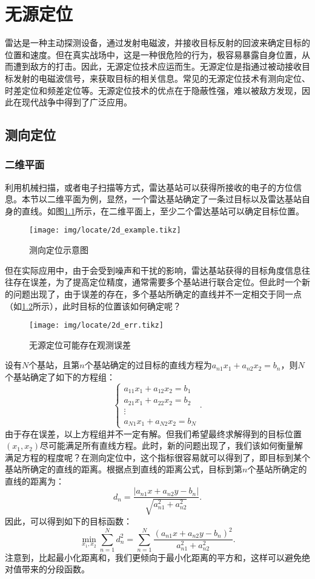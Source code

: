 \chapter{无源定位}

雷达是一种主动探测设备，通过发射电磁波，并接收目标反射的回波来确定目标的位置和速度。但在真实战场中，这是一种很危险的行为，极容易暴露自身位置，从而遭到敌方的打击。因此，无源定位技术应运而生。无源定位是指通过被动接收目标发射的电磁波信号，来获取目标的相关信息。常见的无源定位技术有测向定位、时差定位和频差定位等。无源定位技术的优点在于隐蔽性强，难以被敌方发现，因此在现代战争中得到了广泛应用。

\section{测向定位}
\subsection{二维平面}
利用机械扫描，或者电子扫描等方式，雷达基站可以获得所接收的电子的方位信息。本节以二维平面为例，显然，一个雷达基站确定了一条过目标以及雷达基站自身的直线。如图\cref{fig_locate_example}所示，在二维平面上，至少二个雷达基站可以确定目标位置。
\begin{figure}[htb!]
    \centering
    \texttt{[image: img/locate/2d\_example.tikz]}
    \caption{测向定位示意图}
    \label{fig_locate_example}
\end{figure}

但在实际应用中，由于会受到噪声和干扰的影响，雷达基站获得的目标角度信息往往存在误差，为了提高定位精度，通常需要多个基站进行联合定位。但此时一个新的问题出现了，由于误差的存在，多个基站所确定的直线并不一定相交于同一点（如\cref{fig_locate_error}所示），此时目标的位置该如何确定呢？
\begin{figure}[htb!]
    \centering
    \texttt{[image: img/locate/2d\_err.tikz]}
    \caption{无源定位可能存在观测误差}
    \label{fig_locate_error}
\end{figure}

设有\( N \)个基站，且第\( n \)个基站确定的过目标的直线方程为\( a_{n1} x_1 + a_{n2} x_2 = b_n \)，则\( N \)个基站确定了如下的方程组：
\[
    \begin{cases}
        a_{11} x_1 + a_{12} x_2 = b_1 \\
        a_{21} x_1 + a_{22} x_2 = b_2 \\
        \vdots                        \\
        a_{N1} x_1 + a_{N2} x_2 = b_N
    \end{cases}.
\]
由于存在误差，以上方程组并不一定有解。但我们希望最终求解得到的目标位置\( (x_1, x_2) \)尽可能满足所有直线方程。此时，新的问题出现了，我们该如何衡量解满足方程的程度呢？在测向定位中，这个指标很容易就可以得到了，即目标到某个基站所确定的直线的距离。根据点到直线的距离公式，目标到第\( n \)个基站所确定的直线的距离为：
\[
    d_n = \frac{|a_{n1} x + a_{n2} y - b_n|}{\sqrt{a_{n1}^2 + a_{n2}^2}}.
\]
因此，可以得到如下的目标函数：
\[
    \min_{x_1, x_2} \sum_{n=1}^{N} d_n^2 = \sum_{n=1}^{N} \frac{(a_{n1} x + a_{n2} y - b_n)^2}{a_{n1}^2 + a_{n2}^2}.
\]
注意到，比起最小化距离和，我们更倾向于最小化距离的平方和，这样可以避免绝对值带来的分段函数。

